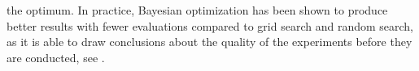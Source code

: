 the optimum. In practice, Bayesian optimization has been shown to produce better results with fewer evaluations compared to grid search and random search, as it is able to draw conclusions about the quality of the experiments before they are conducted, see \cite{SnoekLarochelleAdams:2012}.







